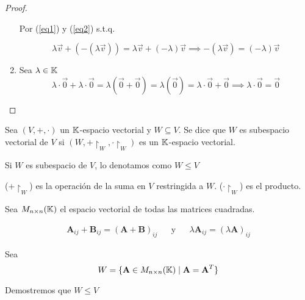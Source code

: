 \begin{proof}
\begin{enumerate}[label=\alph*)]
        Por (\ref{eq1}) y (\ref{eq2}) s.t.q.

        \begin{equation*}
            \lambda \vec{v} + (-(\lambda \vec{v} )) = \lambda \vec{v}  + (-\lambda)\vec{v} \implies -(\lambda \vec{v}) = (-\lambda)\vec{v}
        \end{equation*}

        \item Sea $\lambda \in \mathbb{K}$
        \begin{equation*}
            \lambda \cdot \vec{0} + \lambda \cdot \vec{0}  = \lambda(\vec{0} +\vec{0} ) = \lambda(\vec{0}) = \lambda \cdot \vec{0} + \vec{0} \implies \lambda \cdot  \vec{0} = \vec{0} 
        \end{equation*}
    \end{enumerate}
\end{proof}

\begin{definition}
    Sea $(V,+,\cdot)$ un $\mathbb{K}$-espacio vectorial y $W \subseteq V$. Se dice que $W$ es subespacio vectorial de $V$ si $(W,+ \restriction_W,\cdot  {\restriction}_{W})$ es un $\mathbb{K}$-espacio vectorial.
\end{definition}

\begin{notation}
    Si $W$ es subespacio de $V$, lo denotamos como $W \leq V$
\end{notation}

\begin{notation}
    ($+ {\restriction}_{W}$) es la operación de la suma en $V$ restringida a $W$. ($\cdot {\restriction}_{W}$) es el producto.
\end{notation}

\begin{eg}
    Sea ${M}_{n \times n}(\mathbb{K})$ el espacio vectorial de todas las matrices cuadradas.

    \begin{align*}
    {\textbf{A}}_{ij}+{\textbf{B}}_{ij}= {(\textbf{A}+\textbf{B})}_{ij}& & \text{y} & & \lambda {\textbf{A}}_{ij}= {(\lambda \textbf{A})}_{ij}
    \end{align*}

    Sea 
    \begin{equation*}
        W = \{ \textbf{A} \in  {M}_{n \times n}(\mathbb{K}) \mid \textbf{A} = {\textbf{A}}^{T}\}
    \end{equation*}

    Demostremos que $W \leq V$
\end{eg}

